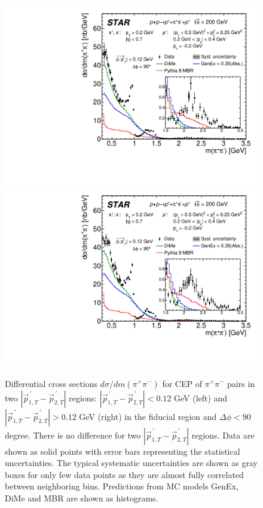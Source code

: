\begin{figure}[h]
\centering
\hspace*{5pt}
\includegraphics[width=.46\textwidth,page=1]{graphics/physicsResults/FinalResult_InvMass_pion_SmallDpt_DeltaPhiLessThan90.pdf}
\hfill
\includegraphics[width=.46\textwidth,page=1]{graphics/physicsResults/FinalResult_InvMass_pion_LargeDpt_DeltaPhiLessThan90.pdf}
\hspace*{5pt}
%
\caption{Differential cross sections $d\sigma/dm(\pi^+\pi^-)$ for CEP of $\pi^+\pi^-$ pairs in two $|\vec{p}_{1,T}^{\,\prime}-\vec{p}_{2,T}^{\,\prime}|$ regions: $|\vec{p}_{1,T}^{\,\prime}-\vec{p}_{2,T}^{\,\prime}|<0.12$ GeV (left) and $|\vec{p}_{1,T}^{\,\prime}-\vec{p}_{2,T}^{\,\prime}|>0.12$ GeV (right)  in the fiducial region and $\Delta\phi<90$ degree. There is no difference for two $|\vec{p}_{1,T}^{\,\prime}-\vec{p}_{2,T}^{\,\prime}|$ regions. Data are shown as solid points with error bars representing the statistical uncertainties. The typical systematic uncertainties are shown as gray boxes for only few data points as they are almost fully correlated between neighboring bins. Predictions from MC models GenEx, DiMe and MBR are shown as histograms.}
\label{results_5}
\end{figure}


